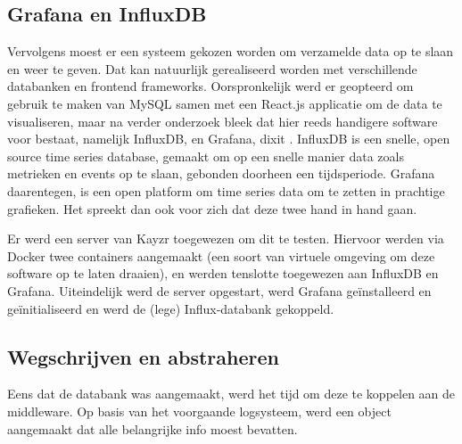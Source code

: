 \subsection{Grafana en InfluxDB}
\label{sec:grafanaAndInflux}

Vervolgens moest er een systeem gekozen worden om verzamelde data op te slaan en weer te geven. Dat kan natuurlijk gerealiseerd worden met verschillende databanken en frontend frameworks. Oorspronkelijk werd er geopteerd om gebruik te maken van MySQL samen met een React.js applicatie om de data te visualiseren, maar na verder onderzoek bleek dat hier reeds handigere software voor bestaat, namelijk InfluxDB, en Grafana, dixit \textcite{Hill2015}. InfluxDB is een snelle, open source time series database, gemaakt om op een snelle manier data zoals metrieken en events op te slaan, gebonden doorheen een tijdsperiode. Grafana daarentegen, is een open platform om time series data om te zetten in prachtige grafieken. Het spreekt dan ook voor zich dat deze twee hand in hand gaan.

Er werd een server van Kayzr toegewezen om dit te testen. Hiervoor werden via Docker twee containers aangemaakt (een soort van virtuele omgeving om deze software op te laten draaien), en werden tenslotte toegewezen aan InfluxDB en Grafana. Uiteindelijk werd de server opgestart, werd Grafana geïnstalleerd en geïnitialiseerd en werd de (lege) Influx-databank gekoppeld. 

\subsection{Wegschrijven en abstraheren}
\label{sec:abstraction}
Eens dat de databank was aangemaakt, werd het tijd om deze te koppelen aan de middleware. Op basis van het voorgaande logsysteem, werd een object aangemaakt dat alle belangrijke info moest bevatten. 

